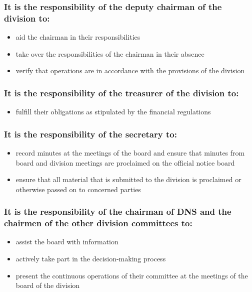 \subsubsection{It is the responsibility of the deputy chairman of the division to:}

\begin{itemize}
  \item aid the chairman in their responsibilities 
  \item take over the responsibilities of the chairman in their absence 
  \item verify that operations are in accordance with the provisions of the division 
\end{itemize}

\subsubsection{It is the responsibility of the treasurer of the division to:}

\begin{itemize}
  \item fulfill their obligations as stipulated by the financial regulations 
\end{itemize}

\subsubsection{It is the responsibility of the secretary to:}

\begin{itemize}
  \item record minutes at the meetings of the board and ensure that minutes from board and division meetings are proclaimed on the official notice board
  \item ensure that all material that is submitted to the division is proclaimed or otherwise passed on to concerned parties
\end{itemize}

\subsubsection{It is the responsibility of the chairman of DNS and the chairmen of the other division committees to:}

\begin{itemize}
  \item assist the board with information 
  \item actively take part in the decision-making process 
  \item present the continuous operations of their committee at the meetings of the board of the division
\end{itemize}

